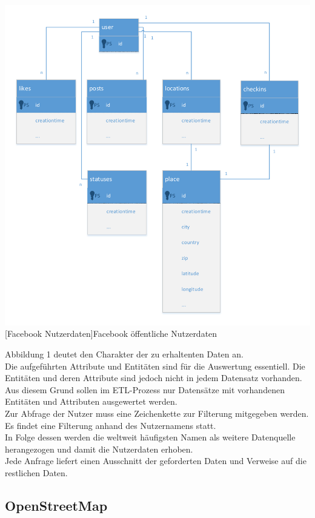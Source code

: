 \documentclass[a4paper,12pt]{scrartcl}
\makeatletter
\def\ScaleIfNeeded{%
\ifdim\Gin@nat@width>\linewidth
\linewidth
\else
\Gin@nat@width
\fi
}
\makeatother
\begin{document}
\begin{center}
\centering
\includegraphics[width=\ScaleIfNeeded]{../user.pdf}%
[Facebook Nutzerdaten]{Facebook öffentliche Nutzerdaten}%
\end{center}

Abbildung 1 deutet den Charakter der zu erhaltenten Daten an.\\
Die aufgeführten Attribute und Entitäten sind für die Auswertung essentiell. Die Entitäten und deren Attribute sind jedoch nicht in jedem Datensatz vorhanden.\\
Aus diesem Grund sollen im ETL-Prozess nur Datensätze mit vorhandenen Entitäten und Attributen ausgewertet werden.\\

Zur Abfrage der Nutzer muss eine Zeichenkette zur Filterung mitgegeben werden. Es findet eine Filterung anhand des Nutzernamens statt.\\
In  Folge dessen werden die weltweit häufigsten Namen als weitere Datenquelle herangezogen und damit die Nutzerdaten erhoben.\\

Jede Anfrage liefert einen Ausschnitt der geforderten Daten und Verweise auf die restlichen Daten.


\subsection{OpenStreetMap}
\end{document}

